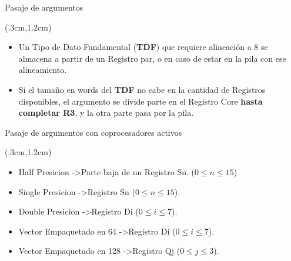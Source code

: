 \documentclass[usenames,table,dvipsnames,aspectratio=169]{beamer}
\begin{document}
\begin{frame}{Pasaje de argumentos}
 \begin{textblock*}{\textwidth}(.3cm,1.2cm)
  \begin{itemize}[<+->] \justifying \parskip 0.3cm
   \item Un Tipo de Dato Fundamental (\textbf{TDF}) que requiere alineación a \SI{8}{\byte} se almacena a partir de un Registro par, o en caso de estar en la pila con ese alineamiento.
   \item Si el tamaño en words del \textbf{TDF} no cabe en la cantidad de Registros disponibles, el argumento se divide parte en el Registro Core \textbf{hasta completar R3}, y la otra parte pasa por la pila.
  \end{itemize}
 \end{textblock*}
\end{frame}

\begin{frame}{Pasaje de argumentos con coprocesadores activos}
 \begin{textblock*}{\textwidth}(.3cm,1.2cm)
  \begin{itemize}[<+(1)->]
   \item Half Presicion -\textgreater Parte baja de un Registro Sn. ($0 \leqslant n \leqslant 15$)
   \item Single Presicion -\textgreater Registro Sn ($0 \leq n \leq 15$).
   \item Double Presicion -\textgreater Registro Di ($0 \leq i \leq 7$).
   \item Vector Empaquetado en \SI{64}{\bit} -\textgreater Registro Di ($0 \leq i \leq 7$).
   \item Vector Empaquetado en \SI{128}{\bit} -\textgreater Registro Qj ($0 \leq j \leq 3$).
  \end{itemize}
 \end{textblock*}
\end{frame}
\end{document}

